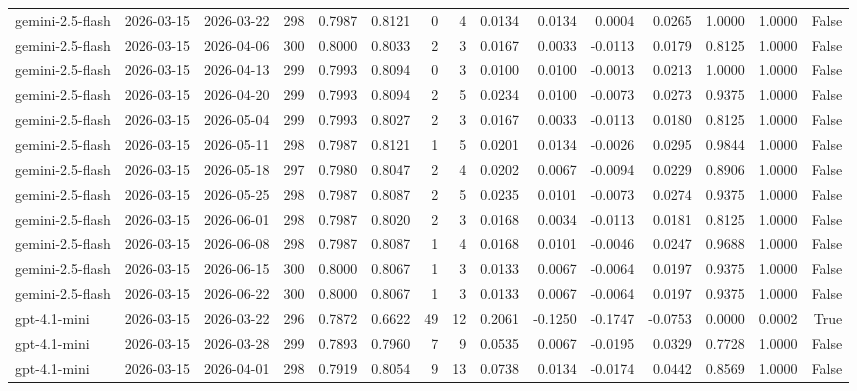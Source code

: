\begin{table}
\begin{tabular}{lllrrrrrrrrrrrr}
gemini-2.5-flash & 2026-03-15 & 2026-03-22 & 298 & 0.7987 & 0.8121 & 0 & 4 & 0.0134 & 0.0134 & 0.0004 & 0.0265 & 1.0000 & 1.0000 & False \\
gemini-2.5-flash & 2026-03-15 & 2026-04-06 & 300 & 0.8000 & 0.8033 & 2 & 3 & 0.0167 & 0.0033 & -0.0113 & 0.0179 & 0.8125 & 1.0000 & False \\
gemini-2.5-flash & 2026-03-15 & 2026-04-13 & 299 & 0.7993 & 0.8094 & 0 & 3 & 0.0100 & 0.0100 & -0.0013 & 0.0213 & 1.0000 & 1.0000 & False \\
gemini-2.5-flash & 2026-03-15 & 2026-04-20 & 299 & 0.7993 & 0.8094 & 2 & 5 & 0.0234 & 0.0100 & -0.0073 & 0.0273 & 0.9375 & 1.0000 & False \\
gemini-2.5-flash & 2026-03-15 & 2026-05-04 & 299 & 0.7993 & 0.8027 & 2 & 3 & 0.0167 & 0.0033 & -0.0113 & 0.0180 & 0.8125 & 1.0000 & False \\
gemini-2.5-flash & 2026-03-15 & 2026-05-11 & 298 & 0.7987 & 0.8121 & 1 & 5 & 0.0201 & 0.0134 & -0.0026 & 0.0295 & 0.9844 & 1.0000 & False \\
gemini-2.5-flash & 2026-03-15 & 2026-05-18 & 297 & 0.7980 & 0.8047 & 2 & 4 & 0.0202 & 0.0067 & -0.0094 & 0.0229 & 0.8906 & 1.0000 & False \\
gemini-2.5-flash & 2026-03-15 & 2026-05-25 & 298 & 0.7987 & 0.8087 & 2 & 5 & 0.0235 & 0.0101 & -0.0073 & 0.0274 & 0.9375 & 1.0000 & False \\
gemini-2.5-flash & 2026-03-15 & 2026-06-01 & 298 & 0.7987 & 0.8020 & 2 & 3 & 0.0168 & 0.0034 & -0.0113 & 0.0181 & 0.8125 & 1.0000 & False \\
gemini-2.5-flash & 2026-03-15 & 2026-06-08 & 298 & 0.7987 & 0.8087 & 1 & 4 & 0.0168 & 0.0101 & -0.0046 & 0.0247 & 0.9688 & 1.0000 & False \\
gemini-2.5-flash & 2026-03-15 & 2026-06-15 & 300 & 0.8000 & 0.8067 & 1 & 3 & 0.0133 & 0.0067 & -0.0064 & 0.0197 & 0.9375 & 1.0000 & False \\
gemini-2.5-flash & 2026-03-15 & 2026-06-22 & 300 & 0.8000 & 0.8067 & 1 & 3 & 0.0133 & 0.0067 & -0.0064 & 0.0197 & 0.9375 & 1.0000 & False \\
gpt-4.1-mini & 2026-03-15 & 2026-03-22 & 296 & 0.7872 & 0.6622 & 49 & 12 & 0.2061 & -0.1250 & -0.1747 & -0.0753 & 0.0000 & 0.0002 & True \\
gpt-4.1-mini & 2026-03-15 & 2026-03-28 & 299 & 0.7893 & 0.7960 & 7 & 9 & 0.0535 & 0.0067 & -0.0195 & 0.0329 & 0.7728 & 1.0000 & False \\
gpt-4.1-mini & 2026-03-15 & 2026-04-01 & 298 & 0.7919 & 0.8054 & 9 & 13 & 0.0738 & 0.0134 & -0.0174 & 0.0442 & 0.8569 & 1.0000 & False \\

\end{tabular}
\end{table}
